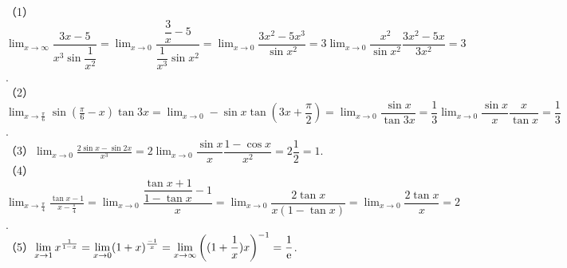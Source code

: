 \begin{solution}
    （1）$\displaystyle\lim_{x\to\infty}\dfrac{3x-5}{x^3\sin\dfrac{1}{x^2}}=\lim_{x\to 0}\dfrac{\dfrac{3}{x}-5}{\dfrac{1}{x^3}\sin x^2}=\lim_{x\to 0}\dfrac{3x^2-5x^3}{\sin x^2}=3\lim_{x\to 0}\dfrac{x^2}{\sin x^2}\dfrac{3x^2-5x}{3x^2}=3$.\\\vspace{0.5em}
    （2）$\displaystyle\lim _{x \rightarrow \frac{\pi}{6}} \sin \left(\frac{\pi}{6}-x\right) \tan 3 x=\lim _{x \rightarrow 0}-\sin x\tan(3x+\dfrac{\pi}{2})=\lim_{x\to 0}\dfrac{\sin x}{\tan 3x}=\dfrac13\lim_{x\to 0}\dfrac{\sin x}{x}\dfrac{x}{\tan x}=\dfrac13$.\\\vspace{0.5em}
    （3）$\displaystyle\lim _{x \rightarrow 0} \frac{2 \sin x-\sin 2 x}{x^{3}}=2\lim _{x \rightarrow 0}\dfrac{\sin x}{x}\dfrac{1-\cos x}{x^2}=2\dfrac12=1$.\\\vspace{0.5em}
    （4）$\displaystyle\lim _{x \rightarrow \frac{\pi}{4}} \frac{\tan x-1}{x-\frac{\pi}{4}}=\lim _{x \rightarrow 0}\dfrac{\dfrac{\tan x+1}{1-\tan x}-1}{x}=\lim _{x \rightarrow 0}\dfrac{2\tan x}{x(1-\tan x)}=\lim_{x\to 0}\dfrac{2\tan x}{x}=2$.\\\vspace{0.5em}
    （5）$\displaystyle\lim _{x \rightarrow 1} x^{\frac{1}{1-x}}=\lim _{x \rightarrow 0}(1+x)^{\frac{-1}{x}}=\lim_{x \rightarrow \infty}\bigg((1+\dfrac1x){x}\bigg)^{-1}=\dfrac{1}{\text{e}}$.
\end{solution}
